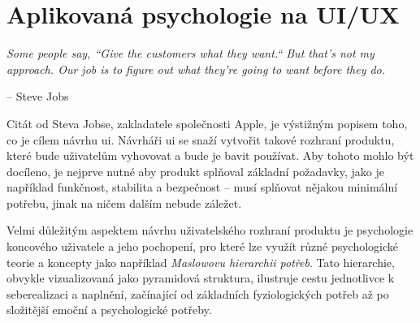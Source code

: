 \section{Aplikovaná psychologie na UI/UX}
\label{sec:navrh-uzivatelskeho-rozhrani-psychologie}

\setlength{}
\epigraph{\textit{Some people say, ``Give the customers what they want.`` But that's not my approach. Our job is to figure out what they're going to want before they do.}}{-- Steve Jobs}

Citát od Steva Jobse, zakladatele společnosti Apple, je výstižným popisem toho, co je cílem návrhu \ac{ui}.
Návrháři \ac{ui} se snaží vytvořit takové rozhraní produktu, které bude uživatelům vyhovovat a bude je bavit používat.
Aby tohoto mohlo být docíleno, je nejprve nutné aby produkt splňoval základní požadavky, jako je například funkčnost, stabilita a bezpečnost – musí splňovat nějakou minimální potřebu, jinak na ničem dalším nebude záležet\cite{bradley_hierarchy_of_needs}.

Velmi důležitým aspektem návrhu uživatelského rozhraní produktu je psychologie koncového uživatele a jeho pochopení, pro které lze využít různé psychologické teorie a koncepty jako například \textit{Maslowovu hierarchii potřeb}.
Tato hierarchie, obvykle vizualizovaná jako pyramidová struktura, ilustruje cestu jednotlivce k seberealizaci a naplnění, začínající od základních fyziologických potřeb až po složitější emoční a psychologické potřeby\cite{maslow_motivace_osobnost}.

